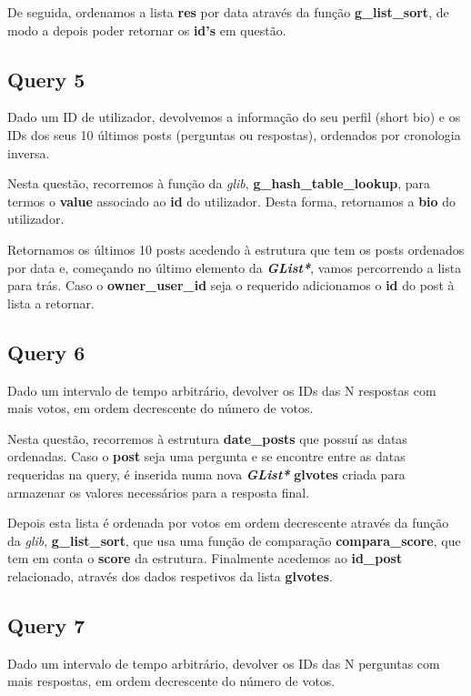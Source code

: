 \documentclass[a4paper]{article}
\begin{document}
De seguida, ordenamos a lista \textbf{res} por data através da função
\textbf{g\_list\_sort}, de modo a depois poder retornar os \textbf{id's}
em questão.

\subsection{Query 5}

Dado um ID de utilizador, devolvemos a informação do seu perfil (short 
bio) e os IDs dos seus 10 últimos posts (perguntas ou respostas), 
ordenados por cronologia inversa.

Nesta questão, recorremos à função da \textit{glib}, 
\textbf{g\_hash\_table\_lookup}, para termos o \textbf{value} 
associado ao \textbf{id} do utilizador. Desta forma, retornamos a 
\textbf{bio} do utilizador.

Retornamos os últimos 10 posts acedendo à estrutura que tem os posts
ordenados por data e, começando no último elemento da \textit{
\textbf{GList*}}, vamos percorrendo a lista para trás. Caso o 
\textbf{owner\_user\_id} seja o requerido adicionamos o \textbf{id} 
do post à lista a retornar.

\subsection{Query 6}

Dado um intervalo de tempo arbitrário, devolver os IDs das N respostas 
com mais votos, em ordem decrescente do número de votos.

Nesta questão, recorremos à estrutura \textbf{date\_posts} que possuí 
as datas ordenadas. Caso o \textbf{post} seja uma pergunta e
se encontre entre as datas requeridas na query, é inserida numa nova
\textit{\textbf{GList*}} \textbf{glvotes} criada para armazenar os 
valores necessários para a resposta final.

Depois esta lista é ordenada por votos em ordem decrescente através da 
função da \textit{glib}, \textbf{g\_list\_sort}, que usa uma função de 
comparação \textbf{compara\_score}, que tem em conta o \textbf{score}
da estrutura. Finalmente acedemos ao \textbf{id\_post} relacionado, 
através dos dados respetivos da lista \textbf{glvotes}.

\subsection{Query 7}

Dado um intervalo de tempo arbitrário, devolver os IDs das N perguntas 
com mais respostas, em ordem decrescente do número de votos.
\end{document}
